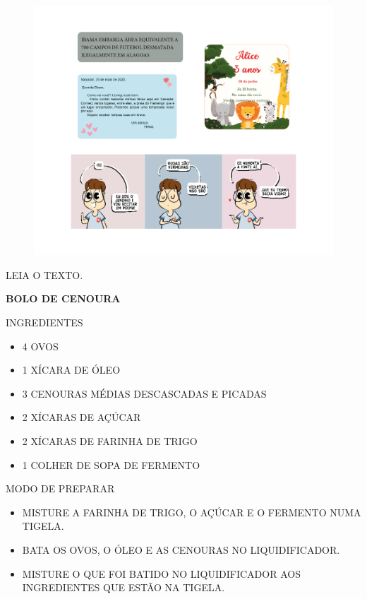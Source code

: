 \begin{figure}[H]
\centering
\includegraphics[width=\textwidth]{media/image141a152.png}
\end{figure}


LEIA O TEXTO.

\begin{myquote}
\textbf{BOLO DE CENOURA}


INGREDIENTES

\begin{itemize}
\item 4 OVOS
\item 1 XÍCARA DE ÓLEO
\item 3 CENOURAS MÉDIAS DESCASCADAS E PICADAS
\item 2 XÍCARAS DE AÇÚCAR
\item 2 XÍCARAS DE FARINHA DE TRIGO
\item 1 COLHER DE SOPA DE FERMENTO
\end{itemize}

MODO DE PREPARAR

\begin{itemize}
\item
  MISTURE A FARINHA DE TRIGO, O AÇÚCAR E O FERMENTO NUMA TIGELA.

\item
  BATA OS OVOS, O ÓLEO E AS CENOURAS NO LIQUIDIFICADOR.

\item
  MISTURE O QUE FOI BATIDO NO LIQUIDIFICADOR AOS INGREDIENTES QUE ESTÃO NA TIGELA.
\end{itemize}
\end{myquote}

